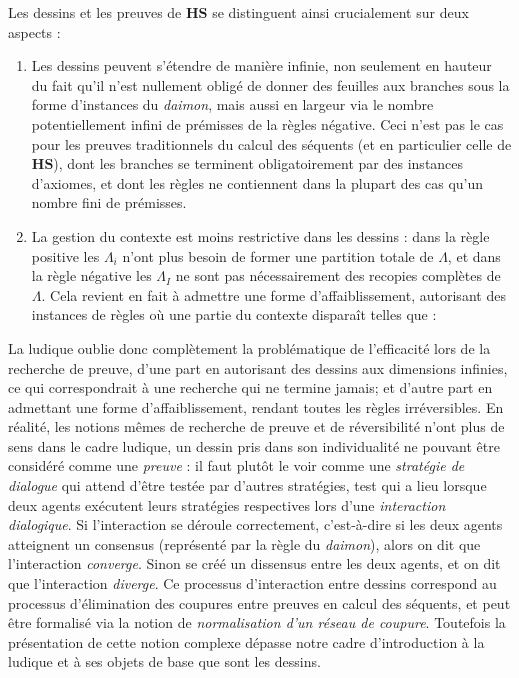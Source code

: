 \documentclass[12pt]{report}
\newcommand{\seq}{\vdash}
\newcommand{\irule}[1]{\footnotesize$#1$}
\begin{document}
Les dessins et les preuves de $\mathbf{HS}$ se distinguent ainsi crucialement sur deux aspects :
\begin{enumerate}
	\item Les dessins peuvent s'étendre de manière infinie, non seulement en hauteur du fait qu'il n'est nullement obligé de donner des feuilles aux branches sous la forme d'instances du \textit{daimon}, mais aussi en largeur via le nombre potentiellement infini de prémisses de la règles négative. Ceci n'est pas le cas pour les preuves traditionnels du calcul des séquents (et en particulier celle de $\mathbf{HS}$), dont les branches se terminent obligatoirement par des instances d'axiomes, et dont les règles ne contiennent dans la plupart des cas qu'un nombre fini de prémisses.
	\item La gestion du contexte est moins restrictive dans les dessins : dans la règle positive les $\Lambda_i$ n'ont plus besoin de former une partition totale de $\Lambda$, et dans la règle négative les $\Lambda_I$ ne sont pas nécessairement des recopies complètes de $\Lambda$. Cela revient en fait à admettre une forme d'affaiblissement, autorisant des instances de règles où une partie du contexte disparaît telles que :\\
	\begin{longtabu}{>{$}c<{$}>{$}c<{$}}
		\prftree[r]{\irule{\xi,\{1,2\}}}
		{\xi \ast 1 \seq \alpha}
		{\xi \ast 2 \seq \beta}
		{\seq \xi,\alpha,\beta,\gamma} &
		\prftree[r]{\irule{\xi,\{\{1,2\},\{1,3\}\}}}
		{\seq \xi \ast \{1,2\},\alpha,\beta}
		{\seq \xi \ast \{1,3\},\alpha}
		{\xi \seq \alpha,\beta,\gamma}
	\end{longtabu}
\end{enumerate}

La ludique oublie donc complètement la problématique de l'efficacité lors de la recherche de preuve, d'une part en autorisant des dessins aux dimensions infinies, ce qui correspondrait à une recherche qui ne termine jamais; et d'autre part en admettant une forme d'affaiblissement, rendant toutes les règles irréversibles. En réalité, les notions mêmes de recherche de preuve et de réversibilité n'ont plus de sens dans le cadre ludique, un dessin pris dans son individualité ne pouvant être considéré comme une \emph{preuve} : il faut plutôt le voir comme une \emph{stratégie de dialogue} qui attend d'être testée par d'autres stratégies, test qui a lieu lorsque deux agents exécutent leurs stratégies respectives lors d'une \emph{interaction dialogique}. Si l'interaction se déroule correctement, c'est-à-dire si les deux agents atteignent un consensus (représenté par la règle du \textit{daimon}), alors on dit que l'interaction \emph{converge}. Sinon se créé un dissensus entre les deux agents, et on dit que l'interaction \emph{diverge}. Ce processus d'interaction entre dessins correspond au processus d'élimination des coupures entre preuves en calcul des séquents, et peut être formalisé via la notion de \emph{normalisation d'un réseau de coupure}. Toutefois la présentation de cette notion complexe dépasse notre cadre d'introduction à la ludique et à ses objets de base que sont les dessins.\\
\end{document}
